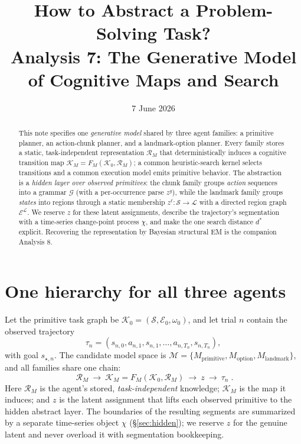\documentclass[11pt]{article}
\title{How to Abstract a Problem-Solving Task?\\
\large Analysis 7: The Generative Model of Cognitive Maps and Search}
\author{}
\date{7 June 2026}
\begin{document}
\maketitle

\begin{abstract}
This note specifies one \emph{generative model} shared by three agent families: a
primitive planner, an action-chunk planner, and a landmark-option planner. Every family
stores a static, task-independent representation $\mathcal R_M$ that deterministically
induces a cognitive transition map $\mathcal K_M=F_M(\mathcal K_0,\mathcal R_M)$; a common
heuristic-search kernel selects transitions and a common execution model emits primitive
behavior. The abstraction is a \emph{hidden layer over observed primitives}: the chunk
family groups \emph{action} sequences into a grammar $\mathcal G$ (with a per-occurrence
parse $z^{g}$), while the landmark family groups \emph{states} into regions through a
static membership $z^{\ell}:\mathcal S\to\mathcal L$ with a directed region graph
$\mathcal E^{\mathcal L}$. We reserve $z$ for these latent assignments, describe the
trajectory's segmentation with a time-series change-point process $\chi$, and make the one
search distance $d^{*}$ explicit. Recovering the representation by Bayesian structural EM is
the companion Analysis 8.
\end{abstract}

\section{One hierarchy for all three agents}

Let the primitive task graph be $\mathcal K_0=(\mathcal S,\mathcal E_0,\omega_0)$, and let
trial $n$ contain the observed trajectory
\[
\tau_n=(s_{n,0},a_{n,1},s_{n,1},\ldots,a_{n,T_n},s_{n,T_n}),
\]
with goal $s_{\star,n}$. The candidate model space is
$\mathcal M=\{M_{\mathrm{primitive}},M_{\mathrm{option}},M_{\mathrm{landmark}}\}$, and all
families share one chain:
\begin{equation}
\boxed{
\;\mathcal R_M\ \longrightarrow\ \mathcal K_M=F_M(\mathcal K_0,\mathcal R_M)\ \longrightarrow\
z\ \longrightarrow\ \tau_n\;}.
\label{eq:hierarchy}
\end{equation}
Here $\mathcal R_M$ is the agent's stored, \emph{task-independent} knowledge; $\mathcal K_M$
is the map it induces; and $z$ is the latent assignment that lifts each observed primitive
to the hidden abstract layer. The boundaries of the resulting segments are summarized by a
separate time-series object $\chi$ (\S\ref{sec:hidden}); we reserve $z$ for the genuine
latent and never overload it with segmentation bookkeeping.
\end{document}
